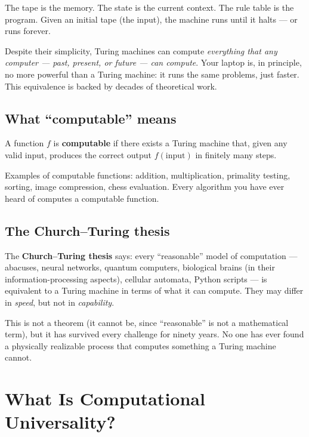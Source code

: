 \documentclass[11pt,a4paper]{article}
\newcommand{\term}[1]{\textbf{#1}}
\begin{document}
The tape is the memory.  The state is the current context.  The rule table is the
program.  Given an initial tape (the input), the machine runs until it halts — or
runs forever.

\begin{tcolorbox}[colback=boxblue,colframe=blue!40!black,title=Why Turing machines matter]
Despite their simplicity, Turing machines can compute \emph{everything that any
computer — past, present, or future — can compute}.  Your laptop is, in principle, no
more powerful than a Turing machine: it runs the same problems, just faster.
This equivalence is backed by decades of theoretical work.
\end{tcolorbox}

\subsection{What ``computable'' means}

A function $f$ is \term{computable} if there exists a Turing machine that, given any
valid input, produces the correct output $f(\text{input})$ in finitely many steps.

Examples of computable functions: addition, multiplication, primality testing, sorting,
image compression, chess evaluation.  Every algorithm you have ever heard of computes
a computable function.

\subsection{The Church--Turing thesis}

The \term{Church--Turing thesis} says: every ``reasonable'' model of computation —
abacuses, neural networks, quantum computers, biological brains (in their
information-processing aspects), cellular automata, Python scripts — is equivalent to
a Turing machine in terms of what it can compute.  They may differ in \emph{speed}, but
not in \emph{capability}.

This is not a theorem (it cannot be, since ``reasonable'' is not a mathematical term),
but it has survived every challenge for ninety years.  No one has ever found a
physically realizable process that computes something a Turing machine cannot.

\section{What Is Computational Universality?}
\end{document}
